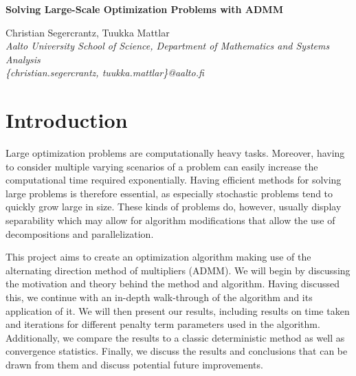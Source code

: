 \documentclass[a4paper]{artikel3}
\begin{document}
\begin{center}
{\Large \onehalfspacing \bf Solving Large-Scale Optimization Problems with ADMM}
\end{center}
\vspace{10pt}


\begin{center}
Christian Segercrantz, Tuukka Mattlar\\ 
{\textit{{\small{Aalto University School of Science, Department of Mathematics and Systems Analysis\\
		         \{christian.segercrantz, tuukka.mattlar\}@aalto.fi}}}}
\end{center}

\section{Introduction} \label{sec:intro}
Large optimization problems are computationally heavy tasks. Moreover, having to consider multiple varying scenarios of a problem can easily increase the computational time required exponentially. Having efficient methods for solving large problems is therefore essential, as especially stochastic problems tend to quickly grow large in size. These kinds of problems do, however, usually display separability which may allow for algorithm modifications that allow the use of decompositions and parallelization.

This project aims to create an optimization algorithm making use of the alternating direction method of multipliers (ADMM). We will begin by discussing the motivation and theory behind the method and algorithm. Having discussed this, we continue with an in-depth walk-through of the algorithm and its application of it. We will then present our results, including results on time taken and iterations for different penalty term parameters used in the algorithm. Additionally, we compare the results to a classic deterministic method as well as convergence statistics. Finally, we discuss the results and conclusions that can be drawn from them and discuss potential future improvements.
\end{document}

